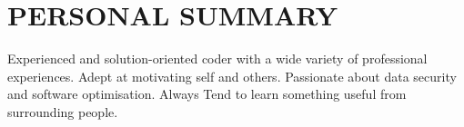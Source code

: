 \section{PERSONAL SUMMARY}
\begin{itemize}[leftmargin=0.15in, label={}]
    \small{\item{Experienced and solution-oriented coder with a wide variety of professional experiences. Adept at motivating self and others. Passionate about data security and software optimisation. Always Tend to learn something useful from surrounding people.}}
\end{itemize}